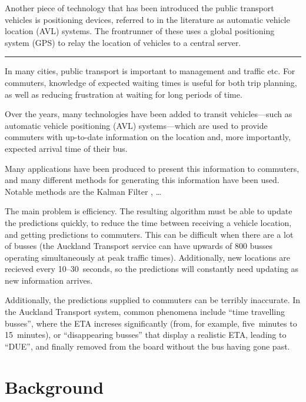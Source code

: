 \documentclass[12pt,a4paper]{article}
\begin{document}
Another piece of technology that has been introduced the public transport vehicles is positioning devices,
referred to in the literature as automatic vehicle location (AVL) systems.
The frontrunner of these uses a global positioning system (GPS) to relay the location of vehicles to a central server.




\vspace{1cm}
\hrule
\vspace{1cm}

In many cities, public transport is important to management and traffic etc.
For commuters, knowledge of expected waiting times is useful for both trip planning,
as well as reducing frustration at waiting for long periods of time.


Over the years, many technologies have been added to transit vehicles---such as 
automatic vehicle positioning (AVL) systems---which are used to provide commuters with
up-to-date information on the location and, more importantly, expected arrival time of their bus.


Many applications have been produced to present this information to commuters, and many different methods
for generating this information have been used.
Notable methods are the Kalman Filter \citep{cathey-dailey:2003}, \ldots


The main problem is efficiency.
The resulting algorithm must be able to update the predictions quickly, 
to reduce the time between receiving a vehicle location, and getting predictions to commuters.
This can be difficult when there are a lot of busses (the Auckland Transport service can have upwards of 800 busses operating simultaneously at peak traffic times).
Additionally, new locations are recieved every 10--30~seconds, 
so the predictions will constantly need updating as new information arrives.



Additionally, the predictions supplied to commuters can be terribly inaccurate.
In the Auckland Transport system, common phenomena include ``time travelling busses'', 
where the ETA increses significantly (from, for example, five~minutes to 15~minutes), 
or ``disappearing busses'' that display a realistic ETA, leading to ``DUE'', 
and finally removed from the board without the bus having gone past.



\section{Background}
\label{sec:background}
\end{document}

